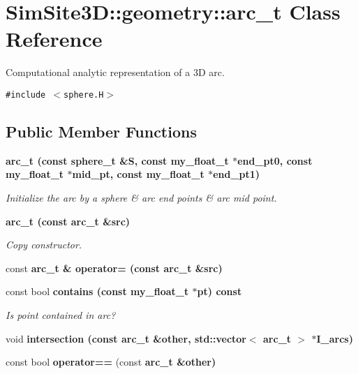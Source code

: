 \section{SimSite3D::geometry::arc\_\-t Class Reference}
\label{classSimSite3D_1_1geometry_1_1arc__t}
Computational analytic representation of a 3D arc.  


{\tt \#include $<$sphere.H$>$}

\subsection*{Public Member Functions}
\begin{CompactItemize}
\item 
\bf{arc\_\-t} (const sphere\_\-t \&S, const my\_\-float\_\-t $\ast$end\_\-pt0, const my\_\-float\_\-t $\ast$mid\_\-pt, const my\_\-float\_\-t $\ast$end\_\-pt1)\label{classSimSite3D_1_1geometry_1_1arc__t_fd9cea33957ae88b1f380bf809cbbff6}

\begin{CompactList}\small\item\em Initialize the arc by a sphere \& arc end points \& arc mid point. \item\end{CompactList}\item 
\bf{arc\_\-t} (const \bf{arc\_\-t} \&src)\label{classSimSite3D_1_1geometry_1_1arc__t_18b1410a465b4add59d54d8654bf8842}

\begin{CompactList}\small\item\em Copy constructor. \item\end{CompactList}\item 
const \bf{arc\_\-t} \& \textbf{operator=} (const \bf{arc\_\-t} \&src)\label{classSimSite3D_1_1geometry_1_1arc__t_3b16dc08c008f6d80be326665a19a1a1}

\item 
const bool \bf{contains} (const my\_\-float\_\-t $\ast$pt) const \label{classSimSite3D_1_1geometry_1_1arc__t_01ba159b58239264350e90caa746dca7}

\begin{CompactList}\small\item\em Is point contained in arc? \item\end{CompactList}\item 
void \bf{intersection} (const \bf{arc\_\-t} \&other, std::vector$<$ \bf{arc\_\-t} $>$ $\ast$I\_\-arcs)
\item 
const bool \textbf{operator==} (const \bf{arc\_\-t} \&other)\label{classSimSite3D_1_1geometry_1_1arc__t_b08aec83d224c06d7b35f6fdcc70d478}


\end{CompactItemize}
